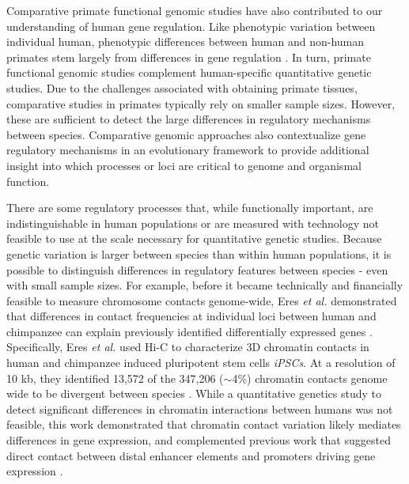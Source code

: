 Comparative primate functional genomic studies have also contributed to our understanding of human gene regulation. Like phenotypic variation between individual human, phenotypic differences between human and non-human primates stem largely from differences in gene regulation \citep{King1975, carroll_evolution_2005, gilad_expression_2006, wray_evolutionary_2007, blekhman_gene_2008, karaman_comparative_2003}. In turn, primate functional genomic studies complement human-specific quantitative genetic studies. Due to the challenges associated with obtaining primate tissues, comparative studies in primates typically rely on smaller sample sizes. However, these are sufficient to detect the large differences in regulatory mechanisms between species. Comparative genomic approaches also contextualize gene regulatory mechanisms in an evolutionary framework to provide additional insight into which processes or loci are critical to genome and organismal function. 

There are some regulatory processes that, while functionally important, are indistinguishable in human populations or are measured with technology not feasible to use at the scale necessary for quantitative genetic studies. Because genetic variation is larger between species than within human populations, it is possible to distinguish differences in regulatory features between species - even with small sample sizes. For example, before it became technically and financially feasible to measure chromosome contacts genome-wide, Eres \emph{et al.} demonstrated that differences in contact frequencies at individual loci between human and chimpanzee can explain previously identified differentially expressed genes \citep{eres_reorganization_2019}. Specifically, Eres \emph{et al.} used Hi-C to characterize 3D chromatin contacts in human and chimpanzee induced pluripotent stem cells \emph{iPSCs}. At a resolution of 10 kb, they identified 13,572 of the 347,206 ($\sim$4\%) chromatin contacts genome wide to be divergent between species \citep{eres_reorganization_2019}. While a quantitative genetics study to detect significant differences in chromatin interactions between humans was not feasible, this work demonstrated that chromatin contact variation likely mediates differences in gene expression, and complemented previous work that suggested direct contact between distal enhancer elements and promoters driving gene expression \citep{carter_long-range_2002, krivega_enhancer_2012, tolhuis_looping_2002, palstra_-globin_2003, marsman_long_2012}.

